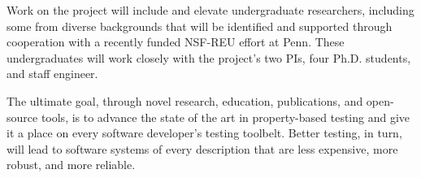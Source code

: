 Work on the project will include and elevate undergraduate
researchers, including some from diverse backgrounds that will be
identified and supported through cooperation with a recently funded NSF-REU effort
at Penn. These undergraduates will work closely with the project's two
PIs, four Ph.D.{} students, and staff engineer.

The ultimate goal, through novel research, education, publications, and open-source
tools, is to advance the state of the art in property-based testing
and give it a place on every
software developer's testing toolbelt.  Better testing, in turn, will
lead to software systems of every description that are less expensive, more
robust, and more reliable.


